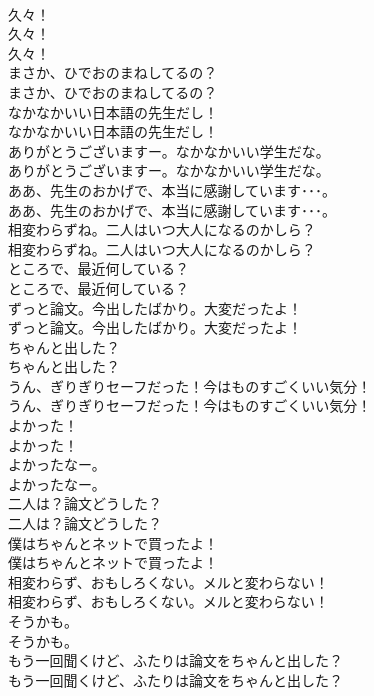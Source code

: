 \documentclass[8pt]{extreport}
\begin{document}
\begin{CJK}{UTF8}{min}
\\	久々！	
\\	久々！ 
\\	久々！ 
\\	まさか、ひでおのまねしてるの？	
\\	まさか、ひでおのまねしてるの？ 
\\	なかなかいい日本語の先生だし！	
\\	なかなかいい日本語の先生だし！ 
\\	ありがとうございますー。なかなかいい学生だな。	
\\	ありがとうございますー。なかなかいい学生だな。 
\\	ああ、先生のおかげで、本当に感謝しています･･･。	
\\	ああ、先生のおかげで、本当に感謝しています･･･。 
\\	相変わらずね。二人はいつ大人になるのかしら？	
\\	相変わらずね。二人はいつ大人になるのかしら？ 
\\	ところで、最近何している？	
\\	ところで、最近何している？ 
\\	ずっと論文。今出したばかり。大変だったよ！	
\\	ずっと論文。今出したばかり。大変だったよ！ 
\\	ちゃんと出した？	
\\	ちゃんと出した？ 
\\	うん、ぎりぎりセーフだった！今はものすごくいい気分！	
\\	うん、ぎりぎりセーフだった！今はものすごくいい気分！ 
\\	よかった！	
\\	よかった！ 
\\	よかったなー。	
\\	よかったなー。 
\\	二人は？論文どうした？	
\\	二人は？論文どうした？ 
\\	僕はちゃんとネットで買ったよ！	
\\	僕はちゃんとネットで買ったよ！ 
\\	相変わらず、おもしろくない。メルと変わらない！	
\\	相変わらず、おもしろくない。メルと変わらない！ 
\\	そうかも。	
\\	そうかも。 
\\	もう一回聞くけど、ふたりは論文をちゃんと出した？	
\\	もう一回聞くけど、ふたりは論文をちゃんと出した？ 

\end{CJK}
\end{document}
